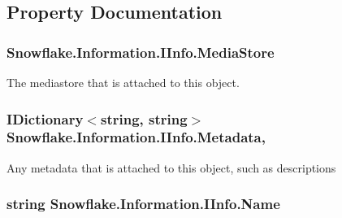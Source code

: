 \subsection{Property Documentation}
\hypertarget{interface_snowflake_1_1_information_1_1_i_info_a871b33234ef2b413be1ee8e6846768b6}{}
\subsubsection[{Media\+Store}]{ Snowflake.\+Information.\+I\+Info.\+Media\+Store\hspace{0.3cm}{\ttfamily [get]}}\label{interface_snowflake_1_1_information_1_1_i_info_a871b33234ef2b413be1ee8e6846768b6}


The mediastore that is attached to this object. 

\hypertarget{interface_snowflake_1_1_information_1_1_i_info_aeae6832deb9c513619b82c82ab94421c}{}
\subsubsection[{Metadata}]{\setlength{\rightskip}{0pt plus 5cm}I\+Dictionary$<$string, string$>$ Snowflake.\+Information.\+I\+Info.\+Metadata\hspace{0.3cm}{\ttfamily [get]}, {\ttfamily [set]}}\label{interface_snowflake_1_1_information_1_1_i_info_aeae6832deb9c513619b82c82ab94421c}


Any metadata that is attached to this object, such as descriptions 

\hypertarget{interface_snowflake_1_1_information_1_1_i_info_ad9450963e1d3443d2e5df274638fd8be}{}
\subsubsection[{Name}]{\setlength{\rightskip}{0pt plus 5cm}string Snowflake.\+Information.\+I\+Info.\+Name\hspace{0.3cm}{\ttfamily [get]}}\label{interface_snowflake_1_1_information_1_1_i_info_ad9450963e1d3443d2e5df274638fd8be}


